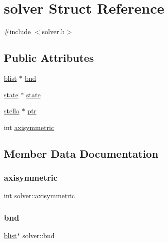 \hypertarget{structsolver}{}\section{solver Struct Reference}
\label{structsolver}


{\ttfamily \#include $<$solver.\+h$>$}

\subsection*{Public Attributes}
\begin{DoxyCompactItemize}
\item 
\mbox{\hyperlink{structblist}{blist}} $\ast$ \mbox{\hyperlink{structsolver_a5ff157229330359463d8fa9cf43d8eaf}{bnd}}
\item 
\mbox{\hyperlink{structstate}{state}} $\ast$ \mbox{\hyperlink{structsolver_a994899554336bb938b900d9f9f2ea7bb}{state}}
\item 
\mbox{\hyperlink{structstella}{stella}} $\ast$ \mbox{\hyperlink{structsolver_a27f2da04c3d4eb24d902d6802b64e0e4}{ptr}}
\item 
int \mbox{\hyperlink{structsolver_a907db6be3bd5760cd75790cac190a365}{axisymmetric}}
\end{DoxyCompactItemize}


\subsection{Member Data Documentation}
\mbox{\label{structsolver_a907db6be3bd5760cd75790cac190a365}} 
\subsubsection{\texorpdfstring{axisymmetric}{axisymmetric}}
{\footnotesize\ttfamily int solver\+::axisymmetric}

\mbox{\label{structsolver_a5ff157229330359463d8fa9cf43d8eaf}} 
\subsubsection{\texorpdfstring{bnd}{bnd}}
{\footnotesize\ttfamily \mbox{\hyperlink{structblist}{blist}}$\ast$ solver\+::bnd}

